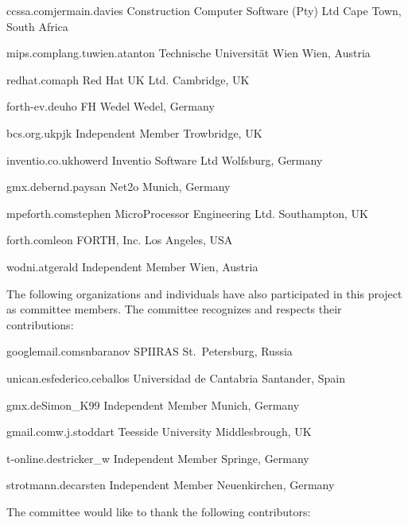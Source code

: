 	{ccssa.com}{jermain.davies}
	{Construction Computer Software (Pty) Ltd}
	{Cape Town, South Africa}

	{mips.complang.tuwien.at}{anton}
	{Technische Universit\"at Wien}
	{Wien, Austria}

	{redhat.com}{aph}
	{Red Hat UK Ltd.}
	{Cambridge, UK}

	{forth-ev.de}{uho}
	{FH Wedel}
	{Wedel, Germany}

	{bcs.org.uk}{pjk}
	{Independent Member}
	{Trowbridge, UK}

	{inventio.co.uk}{howerd}
	{Inventio Software Ltd}
	{Wolfsburg, Germany}

	{gmx.de}{bernd.paysan}
	{Net2o}
	{Munich, Germany}

	{mpeforth.com}{stephen}
	{MicroProcessor Engineering Ltd.}
	{Southampton, UK}

	{forth.com}{leon}
	{FORTH, Inc.}
	{Los Angeles, USA}

	{wodni.at}{gerald}
	{Independent Member}
	{Wien, Austria}

The following organizations and individuals have also participated in
this project as committee members. The committee recognizes and
respects their contributions:

	{googlemail.com}{snbaranov}
	{SPIIRAS}
	{St.\ Petersburg, Russia}

	{unican.es}{federico.ceballos}
	{Universidad de Cantabria}
	{Santander, Spain}

	{gmx.de}{Simon\_K99}
	{Independent Member}
	{Munich, Germany}

	{gmail.com}{w.j.stoddart}
	{Teesside University}
	{Middlesbrough, UK}

	{t-online.de}{stricker\_w}
	{Independent Member}
	{Springe, Germany}

	{strotmann.de}{carsten}
	{Independent Member}
	{Neuenkirchen, Germany}

The committee would like to thank the following contributors:

